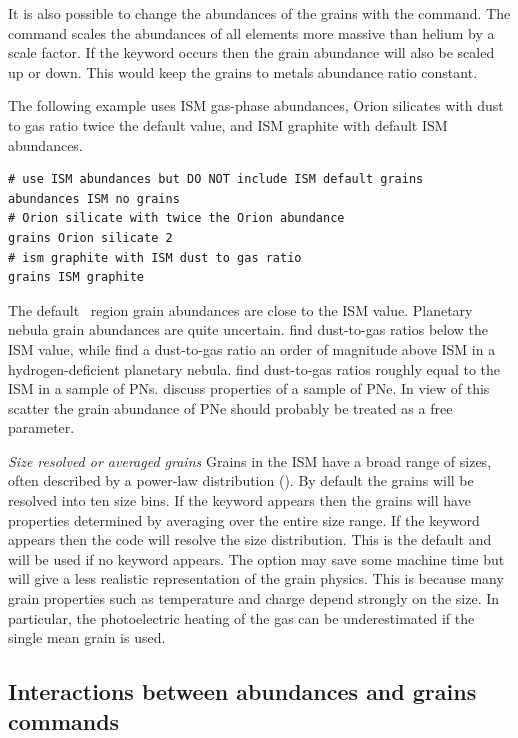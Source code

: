 It is also possible to change the abundances of the grains with the
 command.
The  command scales the
abundances of all elements more massive than helium by a scale factor.
If the keyword  occurs then the grain abundance
will also be scaled up or down.
This would keep the grains to metals abundance ratio constant.

The following example uses ISM gas-phase abundances, Orion silicates
with dust to gas ratio twice the default value,
and ISM graphite with default ISM abundances.
\begin{verbatim}
# use ISM abundances but DO NOT include ISM default grains
abundances ISM no grains
# Orion silicate with twice the Orion abundance
grains Orion silicate 2
# ism graphite with ISM dust to gas ratio
grains ISM graphite
\end{verbatim}
The default \hii\ region grain abundances are close to the ISM value.
Planetary nebula grain abundances are quite uncertain.
\citet{Clegg1989} find dust-to-gas ratios below the ISM value, while
\citet{Borkowski1991} find a dust-to-gas ratio an order of magnitude above ISM
in a hydrogen-deficient planetary nebula.
\citet{Mallik1988} find
dust-to-gas ratios roughly equal to the ISM in a sample of PNs.
\citet{Stasinska1999} discuss properties of a sample of PNe.
In view of this
scatter the grain abundance of PNe should probably be treated as a free
parameter.

\emph{Size resolved or averaged grains} Grains in the ISM have a
broad range of sizes, often described by a power-law distribution
(\citealp{Mathis1977}).
By default the grains will be resolved into ten size bins.
If the keyword  appears then the grains will have
properties determined
by averaging over the entire size range.
If the keyword  appears
then the code will resolve the size distribution.
This is the default and will be used if no keyword appears.
The  option may save some machine
time but will give a less realistic representation of the grain physics.
This is because many grain properties such as temperature and charge
depend strongly on the size.
In particular, the photoelectric heating of the gas
can be underestimated if the single mean grain is used.

\subsection{Interactions between abundances and grains commands}


